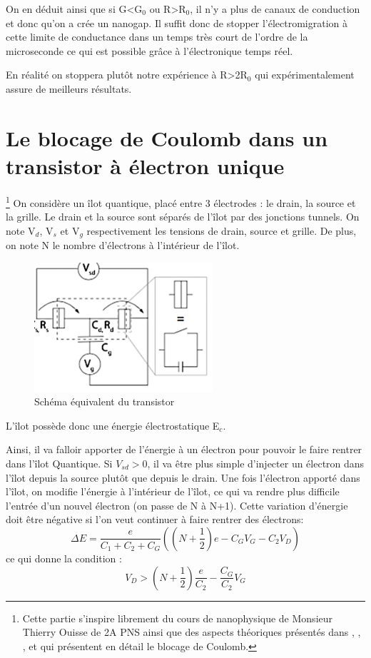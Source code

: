 On en déduit ainsi que si G<G${_0}$ ou R>R${_0}$, il n'y a plus de canaux de conduction et donc qu'on a crée un nanogap. Il suffit donc de stopper l'électromigration à cette limite de conductance dans un temps très court de l'ordre de la microseconde ce qui est possible grâce à l'électronique temps réel\cite{11}.

En réalité on stoppera plutôt notre expérience à R>2R${_0}$ qui expérimentalement assure de meilleurs résultats.

\section{Le blocage de Coulomb dans un transistor à électron unique}
\footnote{Cette partie s'inspire librement du cours de nanophysique de Monsieur Thierry Ouisse de 2A PNS ainsi que des aspects théoriques présentés dans \cite{3}, \cite{5}, \cite{10}, \cite{13} et \cite{15} qui présentent en détail le blocage de Coulomb.}
On considère un îlot quantique, placé entre 3 électrodes : le drain, la source et la grille. Le drain et la source sont séparés de l'îlot par des jonctions tunnels. On note V${_d}$, V${_s}$ et V${_g}$ respectivement les tensions de drain, source et grille. De plus, on note N le nombre d'électrons à l'intérieur de l'îlot. 
\begin{figure}[h]
    \begin{center}
        \includegraphics[width=250px]{Images/Blocage_Coulomb_Schema}
        \caption{Schéma équivalent du transistor}
        \label{fig:}
    \end{center}
\end{figure}

L'îlot possède donc une énergie électrostatique E${_c}$.

Ainsi, il va falloir apporter de l'énergie à un électron pour pouvoir le faire rentrer dans l'îlot Quantique. Si $V_{sd}>0$, il va être plus simple  d'injecter un électron dans l'îlot depuis la source plutôt que depuis le drain. Une fois l'électron apporté dans l'îlot, on modifie l'énergie à l'intérieur de l'îlot, ce qui va rendre plus difficile l'entrée d'un nouvel électron (on passe de N à N+1). Cette variation d'énergie doit être négative si l'on veut continuer à faire rentrer des électrons:
\[\Delta E = \frac{e}{C_1 + C_2 + C_G}\left((N + \frac{1}{2})e - C_G V_G - C_2 V_D\right)\]
ce qui donne la condition :
\[V_D > (N + \frac{1}{2})\frac{e}{C_2} - \frac{C_G}{C_2}V_G\]

